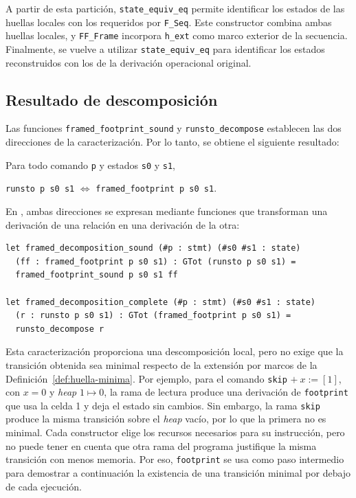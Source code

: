 \documentclass[a4paper,	11pt]{report}
\begin{document}
A partir de esta partición,
\lstinline|state_equiv_eq| permite identificar los estados de las huellas locales con los requeridos por \lstinline|F_Seq|.
Este constructor combina ambas huellas locales,
y \lstinline|FF_Frame| incorpora \lstinline|h_ext| como marco exterior de la secuencia.
Finalmente,
se vuelve a utilizar \lstinline|state_equiv_eq| para identificar los estados reconstruidos con los de la derivación operacional original.

\subsection*{Resultado de descomposición}
Las funciones \lstinline|framed_footprint_sound| y \lstinline|runsto_decompose| establecen las dos direcciones de la caracterización.
Por lo tanto,
se obtiene el siguiente resultado:

\begin{teorema}
Para todo comando \lstinline|p| y estados \lstinline|s0| y \lstinline|s1|,
\begin{center}
\lstinline|runsto p s0 s1| $\iff$ \lstinline|framed_footprint p s0 s1|.
\end{center}
\end{teorema}
En \fstar{},
ambas direcciones se expresan mediante funciones que transforman una derivación de una relación en una derivación de la otra:

\begin{lstlisting}
let framed_decomposition_sound (#p : stmt) (#s0 #s1 : state)
  (ff : framed_footprint p s0 s1) : GTot (runsto p s0 s1) =
  framed_footprint_sound p s0 s1 ff

let framed_decomposition_complete (#p : stmt) (#s0 #s1 : state)
  (r : runsto p s0 s1) : GTot (framed_footprint p s0 s1) =
  runsto_decompose r
\end{lstlisting}

Esta caracterización proporciona una descomposición local,
pero no exige que la transición obtenida sea minimal respecto de la extensión por marcos de la Definición~\ref{def:huella-minima}.
Por ejemplo,
para el comando \lstinline|skip| $+ \ x := [1]$,
con $x = 0$ y \emph{heap} $1 \mapsto 0$,
la rama de lectura produce una derivación de \lstinline|footprint| que usa la celda 1 y deja el estado sin cambios.
Sin embargo,
la rama \lstinline|skip| produce la misma transición sobre el \emph{heap} vacío,
por lo que la primera no es minimal.
Cada constructor elige los recursos necesarios para su instrucción,
pero no puede tener en cuenta que otra rama del programa justifique la misma transición con menos memoria.
Por eso,
\lstinline|footprint| se usa como paso intermedio para demostrar a continuación la existencia de una transición minimal por debajo de cada ejecución.
\end{document}
